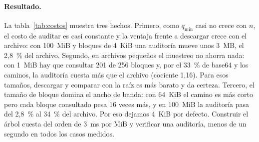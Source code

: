 \documentclass[11pt,a4paper]{article}
\newcommand{\code}[1]{\texttt{#1}}
\begin{document}
\begin{table}[ht]
\centering\footnotesize\setlength{\tabcolsep}{4pt}
\caption{Costo de una auditoría con $q_{\min}$ para $\varepsilon=1$\,\% y 99~\%. «niv.»: niveles del
árbol; «hashes»: longitud media del camino; «MB»: desafío más respuesta; «cociente»: MB de la
auditoría entre el tamaño del archivo; tiempos en ms. Datos: \code{experiments/results/costs.csv}.}
\label{tab:costos}
\end{table}

\paragraph{Resultado.} La tabla~\ref{tab:costos} muestra tres hechos. Primero, como $q_{\min}$ casi
no crece con $n$, el costo de auditar es casi constante y la ventaja frente a descargar crece con el
archivo: con 100~MiB y bloques de 4~KiB una auditoría mueve unos 3~MB, el 2,8~\% del archivo.
Segundo, en archivos pequeños el muestreo no ahorra nada: con 1~MiB hay que consultar 201 de 256
bloques y, por el 33~\% de base64 y los caminos, la auditoría cuesta más que el archivo (cociente
1,16). Para esos tamaños, descargar y comparar con la raíz es más barato y da certeza. Tercero, el
tamaño de bloque domina el ancho de banda: con 64~KiB el camino es más corto pero cada bloque
consultado pesa 16 veces más, y en 100~MiB la auditoría pasa del 2,8~\% al 34~\% del archivo. Por eso
dejamos 4~KiB por defecto. Construir el árbol cuesta del orden de 3~ms por MiB y verificar una
auditoría, menos de un segundo en todos los casos medidos.
\end{document}
